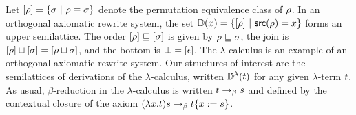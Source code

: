 Let ${[\rho]} = \{\sigma \ |\  \rho \equiv \sigma\}$
denote the permutation equivalence class of $\rho$.
In an orthogonal axiomatic rewrite system,
the set $\mathbb{D}(x) = \{{[\rho]} \ |\  \mathsf{src}(\rho) = x\}$
forms an upper semilattice.
The order ${[\rho]} \sqsubseteq {[\sigma]}$ is given by $\rho \sqsubseteq \sigma$,
the join is ${[\rho]} \sqcup {[\sigma]} = {[\rho \sqcup \sigma]}$,
and the bottom is $\bot = {[\epsilon]}$.
The $\lambda$-calculus is an example of an orthogonal axiomatic rewrite system.
Our structures of interest are the semilattices of derivations of the $\lambda$-calculus,
written $\mathbb{D}^{\lambda}(t)$ for any given $\lambda$-term $t$.
As usual, $\beta$-reduction in the $\lambda$-calculus
is written $t \mathrel{\to_\beta} s$
and defined by the contextual closure of the axiom $(\lambda x. t)s \mathrel{\to_\beta} t\{x := s\}$.

